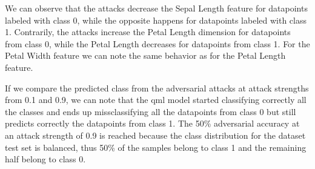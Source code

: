 We can observe that the attacks decrease the Sepal Length feature
for datapoints labeled with class 0, while the opposite happens
for datapoints labeled with class 1. Contrarily, the attacks
increase the Petal Length dimension for datapoints from class 0,
while the Petal Length decreases for datapoints from class 1. For
the Petal Width feature we can note the same behavior as for the
Petal Length feature. \

If we compare the predicted class from the adversarial attacks
at attack strengths from 0.1 and 0.9, we can note that the \ac{qml}
model started classifying correctly all the classes and ends up
missclassifying all the datapoints from class 0 but still
predicts correctly the datapoints from class 1. The 50\% adversarial
accuracy at an attack strength of 0.9 is reached because the class
distribution for the dataset test set is balanced, thus 50\% of
the samples belong to class 1 and the remaining half belong to
class 0. \

